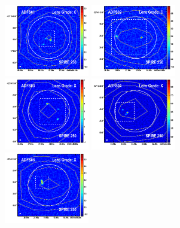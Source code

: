 \documentclass[iop]{emulateapj}
\begin{document}


\begin{figure}[!tbp] 
    \begin{centering}
\includegraphics[width=0.331\textwidth]{../Figures/overlays/ADFS01_870_250.pdf}
\includegraphics[width=0.331\textwidth]{../Figures/overlays/ADFS02_870_250.pdf}
\includegraphics[width=0.331\textwidth]{../Figures/overlays/ADFS03_870_250.pdf}
\includegraphics[width=0.331\textwidth]{../Figures/overlays/ADFS04_870_250.pdf}
\includegraphics[width=0.331\textwidth]{../Figures/overlays/ADFS05_870_250.pdf}

\end{centering}
\end{figure}
\end{document}
